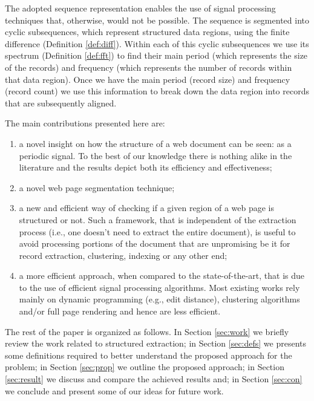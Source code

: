 \documentclass{vldb}
\begin{document}
The adopted sequence representation enables the use of signal processing
techniques that, otherwise, would not be possible. The sequence is segmented
into cyclic subsequences, which represent structured data regions, using the
finite difference (Definition \ref{def:diff}). Within each of this cyclic
subsequences we use its spectrum (Definition \ref{def:fft}) to find their main
period (which represents the size of the records) and frequency (which
represents the number of records within that data region). Once we have the
main period (record size) and frequency (record count) we use this information
to break down the data region into records that are subsequently aligned.

The main contributions presented here are:
\begin{enumerate}
    \item a novel insight on how the structure of a web document can be seen: as
    a periodic signal. To the best of our knowledge there is nothing alike in
    the literature and the results depict both its efficiency and effectiveness;
    \item a novel web page segmentation technique;
    \item a new and efficient way of checking if a given region of a web page is
    structured or not. Such a framework, that is independent of the extraction
    process (i.e., one doesn't need to extract the entire document), is useful
    to avoid processing portions of the document that are unpromising be it for
    record extraction, clustering, indexing or any other end;
    \item a more efficient approach, when compared to the state-of-the-art,
    that is due to the use of efficient signal processing algorithms. Most
    existing works rely mainly on dynamic programming (e.g., edit distance), clustering
    algorithms and/or full page rendering and hence are less efficient.
\end{enumerate}

The rest of the paper is organized as follows. In Section \ref{sec:work} we
briefly review the work related to structured extraction; in Section
\ref{sec:defs} we presents some definitions required to better understand the
proposed approach for the problem; in Section \ref{sec:prop} we outline the
proposed approach; in Section \ref{sec:result} we discuss and compare the
achieved results and; in Section \ref{sec:con} we conclude and present some
of our ideas for future work.
\end{document}
